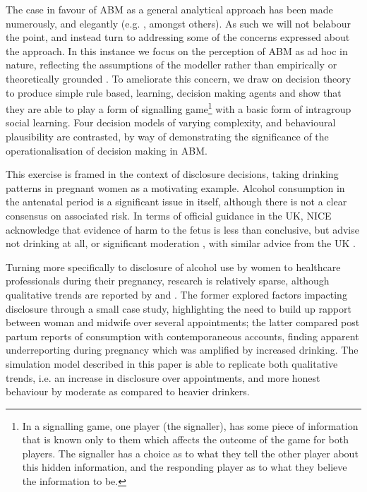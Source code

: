 \documentclass[graybox]{svmult}
\begin{document}
The case in favour of \ac{ABM} as a general analytical approach has been made numerously, and elegantly (e.g. \cite{epstein1994growing,Resnick,Axelrod1997,gilbert1999simulation,Macy2002a,Silverman2011,Silverman2013,epstein2014agent_zero}, amongst others). As such we will not belabour the point, and instead turn to addressing some of the concerns expressed about the approach. In this instance we focus on the perception of \ac{ABM} as ad hoc in nature, reflecting the assumptions of the modeller rather than empirically or theoretically grounded \citep{Waldherr2013}. To ameliorate this concern, we draw on decision theory to produce simple rule based, learning, decision making agents and show that they are able to play a form of signalling game\footnote{In a signalling game, one player (the signaller), has some piece of information that is known only to them which affects the outcome of the game for both players. The signaller has a choice as to what they tell the other player about this hidden information, and the responding player as to what they believe the information to be.} \citep{Kreps1987} with a basic form of intragroup social learning. Four decision models of varying complexity, and behavioural plausibility are contrasted, by way of demonstrating the significance of the operationalisation of decision making in \ac{ABM}.

This exercise is framed in the context of disclosure decisions, taking drinking patterns in pregnant women as a motivating example. Alcohol consumption in the antenatal period is a significant issue in itself, although there is not a clear consensus on associated risk. In terms of official guidance in the UK, \ac{NICE} acknowledge that evidence of harm to the fetus is less than conclusive, but advise not drinking at all, or significant moderation \citep{NICE2010a}, with similar advice from the UK \cite{DepartmentofHealth2008}.

Turning more specifically to disclosure of alcohol use by women to healthcare professionals during their pregnancy, research is relatively sparse, although qualitative trends are reported by \citet{Phillips2007} and \citet{Alvik2006}. The former explored factors impacting disclosure through a small case study, highlighting the need to build up rapport between woman and midwife over several appointments; the latter compared post partum reports of consumption with contemporaneous accounts, finding apparent underreporting during pregnancy which was amplified by increased drinking. The simulation model described in this paper is able to replicate both qualitative trends, i.e. an increase in disclosure over appointments, and more honest behaviour by moderate as compared to heavier drinkers.
\end{document}
